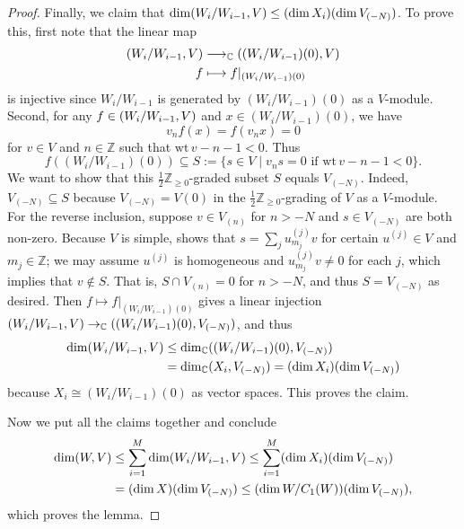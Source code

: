 \documentclass[11pt, reqno]{amsart}
\theoremstyle{definition}\newtheorem{defi}[thm]{Definition}
\theoremstyle{definition}\newtheorem{rem}[thm]{Remark}
\theoremstyle{definition}\newtheorem{exam}[thm]{Example}
\theoremstyle{definition}\newtheorem{assum}[thm]{Assumption}
\newcommand{\CC}{\mathbb{C}}
\newcommand{\ZZ}{\mathbb{Z}}
\let\hom\relax
\DeclareMathOperator{\hom}{Hom}
\begin{document}
\begin{proof}
Finally, we claim that $\dim\hom(W_i/W_{i-1},V)\leq(\dim X_i)(\dim V_{(-N)})$. To prove this, first note that the linear map
\begin{align*}
\hom(W_i/W_{i-1},V) &\longrightarrow \hom_\CC((W_i/W_{i-1})(0),V)\\
f & \longmapsto f\vert_{(W_i/W_{i-1})(0)}
\end{align*}
is injective since $W_i/W_{i-1}$ is generated by $(W_i/W_{i-1})(0)$ as a $V$-module. Second, for any $f\in\hom(W_i/W_{i-1},V)$ and $x\in (W_i/W_{i-1})(0)$, we have
\begin{equation*}
v_n f(x) = f(v_n x) =0
\end{equation*}
for $v\in V$ and $n\in\ZZ$ such that $\mathrm{wt}\,v-n-1<0$. Thus
\begin{equation*}
f((W_i/W_{i-1})(0))\subseteq S:=\lbrace s\in V\mid v_n s=0\,\,\text{if}\,\,\mathrm{wt}\,v-n-1<0\rbrace.
\end{equation*}
We want to show that this $\frac{1}{2}\ZZ_{\geq 0}$-graded subset $S$ equals $V_{(-N)}$. Indeed, $V_{(-N)}\subseteq S$ because $V_{(-N)}=V(0)$ in the $\frac{1}{2}\ZZ_{\geq 0}$-grading of $V$ as a $V$-module. For the reverse inclusion, suppose $v\in V_{(n)}$ for $n>-N$ and $s\in V_{(-N)}$ are both non-zero. Because $V$ is simple, \cite[Proposition 4.5.6]{LL} shows that $s=\sum_j u^{(j)}_{m_j} v$ for certain $u^{(j)}\in V$ and $m_j\in\ZZ$; we may assume $u^{(j)}$ is homogeneous and $u^{(j)}_{m_j} v\neq 0$ for each $j$, which implies that $v\notin S$. That is, $S\cap V_{(n)}=0$ for $n>-N$, and thus $S=V_{(-N)}$ as desired.
 Then $f\mapsto f\vert_{(W_i/W_{i-1})(0)}$ gives a linear injection $\hom(W_i/W_{i-1},V)\rightarrow\hom_\CC((W_i/W_{i-1})(0),V_{(-N)})$, and thus
\begin{align*}
\dim\hom(W_i/W_{i-1},V) & \leq\dim\hom_\CC((W_i/W_{i-1})(0),V_{(-N)})\\
& =\dim\hom_\CC(X_i,V_{(-N)})=(\dim X_i)(\dim V_{(-N)})
\end{align*}
because $X_i\cong (W_i/W_{i-1})(0)$ as vector spaces. This proves the claim.

Now we put all the claims together and conclude
\begin{align*}
\dim\hom(W,V) & \leq\sum_{i=1}^M \dim\hom(W_i/W_{i-1},V)\leq\sum_{i=1}^M (\dim X_i)(\dim V_{(-N)})\\
& =(\dim X)(\dim V_{(-N)})\leq (\dim W/C_1(W))(\dim V_{(-N)}),
\end{align*}
which proves the lemma.
\end{proof}
\end{document}
